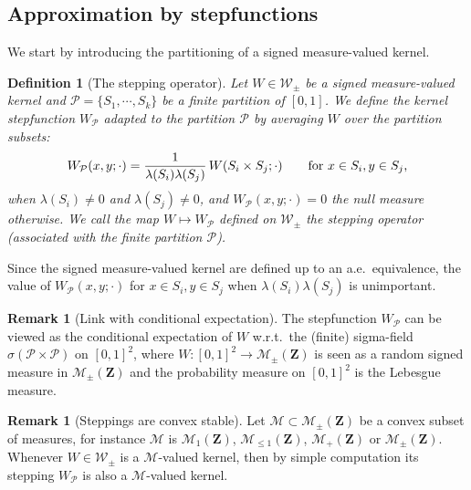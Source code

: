 \documentclass{amsart}
\newcommand{\wrt}{w.r.t.\ }
\theoremstyle{plain}
\newtheorem{defin}[Th]{Definition}
\theoremstyle{definition}
\newtheorem{remark}[Th]{Remark}
\newcommand{\Space}{\mathbf{Z}}
\newcommand{\signed}{\pm}
\newcommand{\cm}{\mathcal{M}}
\newcommand{\cP}{\mathcal{P}}
\newcommand{\Proba}{\mathcal{M}_1(\Space)}
\newcommand{\SubProba}{\mathcal{M}_{\leq1}(\Space)}
\newcommand{\Meas}{\mathcal{M}_+(\Space)}
\newcommand{\SignedMeas}{\mathcal{M}_{\pm}(\Space)}
\newcommand{\Kernel}{\mathcal{W}_{\signed}}
\begin{document}
\subsection{Approximation  by stepfunctions}\label{section_approx}


We start by introducing the partitioning of a signed measure-valued kernel.

\begin{defin}[The stepping operator]
	\label{def_stepping_operator}
Let $W\in \Kernel$ be a signed measure-valued kernel
and  $\mathcal{P}=\{S_1,\cdots,S_k\}$ be a finite partition of $[0,1]$.
We define the kernel stepfunction $W_\mathcal{P}$ adapted to the
partition  $\mathcal{P}$ by averaging $W$ over the partition subsets:
\[
  W_\mathcal{P}(x,y;\cdot) = \frac{1}{\lambda(S_i)\lambda(S_j)}\,
  W(S_i \times S_j;\cdot)
  \qquad \text{for $ x\in S_i, y\in S_j$,}
\]
when $\lambda(S_i)\neq 0$ and $\lambda(S_j)\neq 0$,
and $W_\mathcal{P}(x,y;\cdot) = 0$ the null measure otherwise.
We call the map $W\mapsto W_\cP$ defined on $\Kernel$ the stepping operator 
(associated with the finite partition $\mathcal{P}$).
\end{defin}


Since the signed measure-valued kernel are defined up to an
a.e.\ equivalence, the value of $ W_\mathcal{P}(x,y;\cdot)$ for  $ x\in
S_i, y\in S_j$ when $\lambda(S_i)\lambda(S_j)$ is unimportant. 



\begin{remark}[Link with conditional expectation]
	\label{rem:steping_cond_expectation}
The stepfunction $W_\mathcal{P}$ can be viewed as the conditional expectation
of $W$ \wrt  the (finite) sigma-field $\sigma(\cP\times\cP)$ 
on $[0,1]^2$,
where $W:[0,1]^2\to \SignedMeas$ is seen as 
a random signed measure in $\SignedMeas$ and the probability measure on $[0,
1]^2$ is the Lebesgue measure. 
\end{remark}

\begin{remark}[Steppings are convex stable]
Let $\cm\subset \SignedMeas$ be a convex subset of measures,
for instance $\cm$ is $\Proba$, $\SubProba$, $\Meas$ or $\SignedMeas$.
Whenever $W\in \Kernel$ is a $\cm$-valued kernel, 
then by simple computation its stepping $W_\mathcal{P}$
is also a $\cm$-valued kernel. 
\end{remark}
\end{document}

